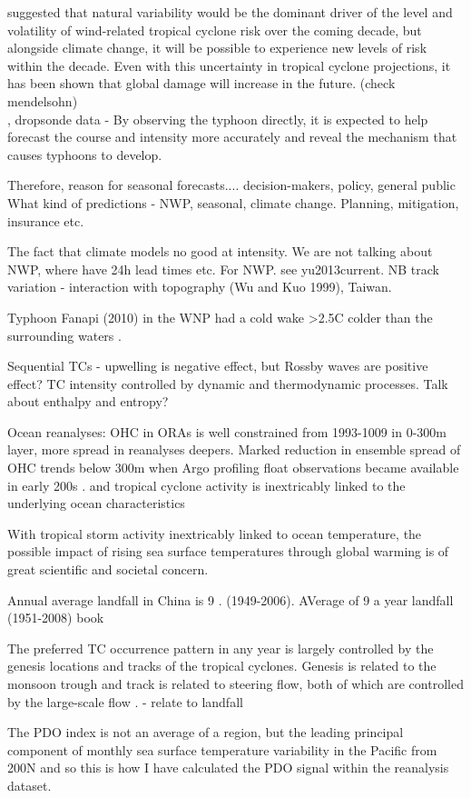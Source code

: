 \cite{ranger2012deep} suggested that natural variability would be the dominant driver of the level and volatility of wind-related tropical cyclone risk over the coming decade, but alongside climate change, it will be possible to experience new levels of risk within the decade. Even with this uncertainty in tropical cyclone projections, it has been shown that global damage will increase in the future. (check mendelsohn)\\

, dropsonde data - By observing the typhoon directly, it is expected to help forecast the course and intensity more accurately and reveal the mechanism that causes typhoons to develop. 

Therefore, reason for seasonal forecasts....
decision-makers, policy, general public
What kind of predictions - NWP, seasonal, climate change. Planning, mitigation, insurance etc.

The fact that climate models no good at intensity. We are not talking about NWP, where have 24h lead times etc. For NWP. see yu2013current.
NB track variation - interaction with topography (Wu and Kuo 1999), Taiwan.

Typhoon Fanapi (2010) in the WNP had a cold wake >2.5C colder than the surrounding waters \citep{mrvaljevic2013observations}. 

Sequential TCs - upwelling is negative effect, but Rossby waves are positive effect?
TC intensity controlled by dynamic and thermodynamic processes.
Talk about enthalpy and entropy?

Ocean reanalyses: OHC in ORAs is well constrained from 1993-1009 in 0-300m layer, more spread in reanalyses deepers. Marked reduction in ensemble spread of OHC trends below 300m when Argo profiling float observations became available in early 200s \citep{palmer2015ocean}.
and tropical cyclone activity is inextricably linked to the underlying ocean characteristics

With tropical storm activity inextricably linked to ocean temperature, the possible impact of rising sea surface temperatures through global warming is of great scientific and societal concern.

Annual average landfall in China is 9 \citep{xiao2013analysis}. (1949-2006). AVerage of 9 a year landfall (1951-2008) book

The preferred TC occurrence pattern in any year is largely controlled by the genesis locations and tracks of the tropical cyclones. Genesis is related to the monsoon trough and track is related to steering flow, both of which are controlled by the large-scale flow \citep{liu2008interdecadal}. - relate to landfall

The PDO index is not an average of a region, but the leading principal component of monthly sea surface temperature variability in the Pacific from 200N and so this is how I have calculated the PDO signal within the reanalysis dataset.	